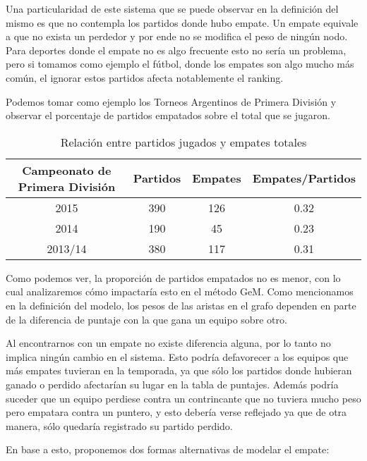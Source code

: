 Una particularidad de este sistema que se puede observar en la definición del
mismo es que no contempla los partidos donde hubo empate. Un empate equivale
a que no exista un perdedor y por ende no se modifica el peso de ningún nodo.
Para deportes donde el empate no es algo frecuente esto no sería un problema,
pero si tomamos como ejemplo el fútbol, donde los empates son algo mucho más
común, el ignorar estos partidos afecta notablemente el ranking.

Podemos tomar como ejemplo los Torneos Argentinos de Primera División y
observar el porcentaje de partidos empatados sobre el total que se jugaron.

\begin{table}[H]
	\centering
	\begin{tabular}{|cccc|}
		\hline
		Campeonato de Primera División & Partidos & Empates &  Empates/Partidos \\ \hline
		2015 & 390 & 126 & 0.32 \\ \hline
		2014 & 190 & 45 & 0.23 \\ \hline
		2013/14 & 380 & 117 & 0.31 \\ \hline
	\end{tabular}
	\caption*{Relación entre partidos jugados y empates totales}
\end{table}

Como podemos ver, la proporción de partidos empatados no es menor, con lo cual
analizaremos cómo impactaría esto en el método GeM. Como mencionamos en la
definición del modelo, los pesos de las aristas en el grafo dependen en parte de la
diferencia de puntaje con la que gana un equipo sobre otro.

Al encontrarnos con un empate no existe diferencia alguna, por lo tanto no
implica ningún cambio en el sistema. Esto podría defavorecer a los equipos que
más empates tuvieran en la temporada, ya que sólo los partidos donde hubieran
ganado o perdido afectarían su lugar en la tabla de puntajes. Además podría
suceder que un equipo perdiese contra un contrincante que no tuviera mucho peso
pero empatara contra un puntero, y esto debería verse reflejado ya que de otra
manera, sólo quedaría registrado su partido perdido.

En base a esto, proponemos dos formas alternativas de modelar el empate:

